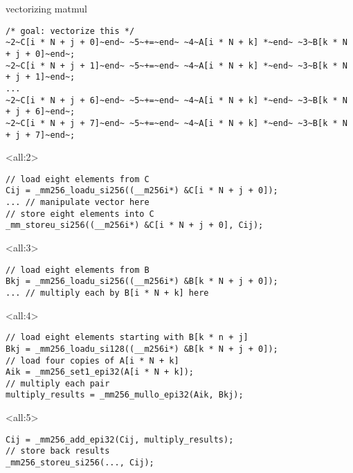 \begin{frame}[fragile,label=sqSerialUnrolledExpand]{vectorizing matmul}
\begin{lstlisting}
/* goal: vectorize this */
~2~C[i * N + j + 0]~end~ ~5~+=~end~ ~4~A[i * N + k] *~end~ ~3~B[k * N + j + 0]~end~;
~2~C[i * N + j + 1]~end~ ~5~+=~end~ ~4~A[i * N + k] *~end~ ~3~B[k * N + j + 1]~end~;
...
~2~C[i * N + j + 6]~end~ ~5~+=~end~ ~4~A[i * N + k] *~end~ ~3~B[k * N + j + 6]~end~;
~2~C[i * N + j + 7]~end~ ~5~+=~end~ ~4~A[i * N + k] *~end~ ~3~B[k * N + j + 7]~end~;
\end{lstlisting}
\hrulefill
\begin{onlyenv}<all:2>
\begin{lstlisting}
// load eight elements from C
Cij = _mm256_loadu_si256((__m256i*) &C[i * N + j + 0]);
... // manipulate vector here
// store eight elements into C
_mm_storeu_si256((__m256i*) &C[i * N + j + 0], Cij);
\end{lstlisting}
\end{onlyenv}
\begin{onlyenv}<all:3>
\begin{lstlisting}
// load eight elements from B
Bkj = _mm256_loadu_si256((__m256i*) &B[k * N + j + 0]);
... // multiply each by B[i * N + k] here
\end{lstlisting}
\end{onlyenv}
\begin{onlyenv}<all:4>
\begin{lstlisting}
// load eight elements starting with B[k * n + j]
Bkj = _mm256_loadu_si128((__m256i*) &B[k * N + j + 0]);
// load four copies of A[i * N + k]
Aik = _mm256_set1_epi32(A[i * N + k]);
// multiply each pair
multiply_results = _mm256_mullo_epi32(Aik, Bkj);
\end{lstlisting}
\end{onlyenv}
\begin{onlyenv}<all:5>
\begin{lstlisting}
Cij = _mm256_add_epi32(Cij, multiply_results);
// store back results
_mm256_storeu_si256(..., Cij);
\end{lstlisting}
\end{onlyenv}
\end{frame}



